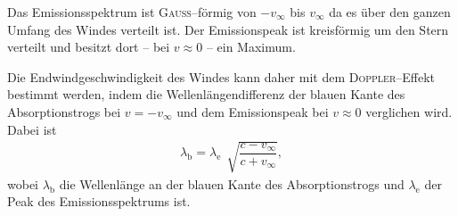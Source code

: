 Das Emissionsspektrum ist \textsc{Gauss}--förmig von $-v_\infty$ bis $v_\infty$ da es über den ganzen Umfang des Windes verteilt ist.
Der Emissionspeak ist kreisförmig um den Stern verteilt und besitzt dort -- bei $v\approx 0$ -- ein Maximum.

Die Endwindgeschwindigkeit des Windes kann daher mit dem \textsc{Doppler}--Effekt bestimmt werden, indem die Wellenlängendifferenz der blauen Kante des Absorptionstrogs bei $v=-v_\infty$ und dem Emissionspeak bei $v\approx 0$ verglichen wird.
Dabei ist
\begin{align} 
  \lambda _\text{b}=\lambda _\text{e}\,\sqrt[]{\dfrac{c-v_\infty}{c+v_\infty}}
,\end{align} 
wobei $\lambda _\text{b}$ die Wellenlänge an der blauen Kante des Absorptionstrogs und $\lambda _\text{e}$ der Peak des Emissionsspektrums ist.
